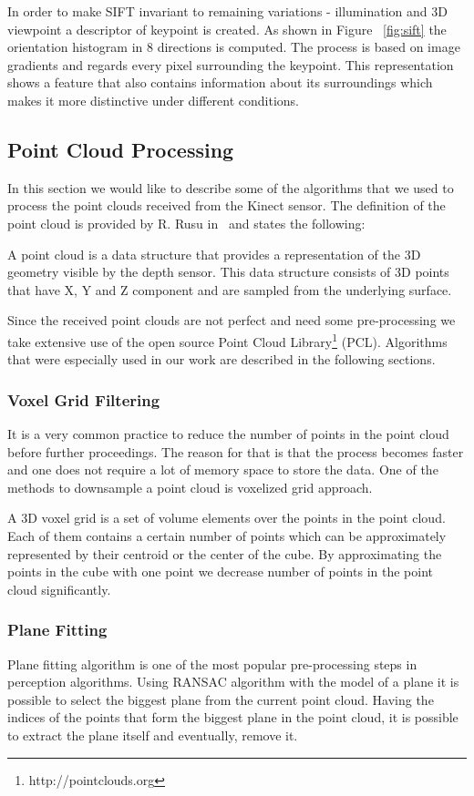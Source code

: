 In order to make SIFT invariant to remaining variations - illumination and 3D viewpoint a descriptor of keypoint is created. As shown in Figure ~\ref{fig:sift} the orientation histogram in 8 directions is computed. The process is based on image gradients and regards every pixel surrounding the keypoint. This representation shows a feature that also contains information about its surroundings which makes it more distinctive under different conditions.


\subsection{Point Cloud Processing}
In this section we would like to describe some of the algorithms that we used to process the point clouds received from the Kinect sensor. The definition of the point cloud is provided by R. Rusu in~\cite{Rusu_ICRA2011_PCL} and states the following:

A point cloud is a data structure that provides a representation of the 3D geometry visible by the depth sensor. This data structure consists of 3D points that have X, Y and Z component and are sampled from the underlying surface.  

Since the received point clouds are not perfect and need some pre-processing we take extensive use of the open source Point Cloud Library\footnote{http://pointclouds.org} (PCL). Algorithms that were especially used in our work are described in the following sections.

\subsubsection{Voxel Grid Filtering}
It is a very common practice to reduce the number of points in the point cloud before further proceedings. The reason for that is that the process becomes faster and one does not require a lot of memory space to store the data. One of the methods to downsample a point cloud is voxelized grid approach.

A 3D voxel grid is a set of volume elements over the points in the point cloud. Each of them contains a certain number of points which can be approximately represented by their centroid or the center of the cube. By approximating the points in the cube with one point we decrease number of points in the point cloud significantly. 

\subsubsection{Plane Fitting}
Plane fitting algorithm is one of the most popular pre-processing steps in perception algorithms. Using RANSAC algorithm with the model of a plane it is possible to select the biggest plane from the current point cloud. Having the indices of the points that form the biggest plane in the point cloud, it is possible to extract the plane itself and eventually, remove it. 

